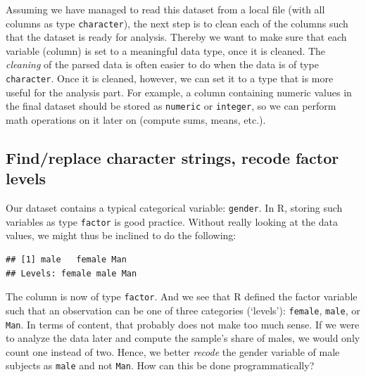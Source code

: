 \documentclass[
  12pt,
]{style/krantz}
\newenvironment{Shaded}{\begin{snugshade}}{\end{snugshade}}
\newcommand{\FunctionTok}[1]{\textcolor[rgb]{0.00,0.00,0.00}{#1}}
\newcommand{\NormalTok}[1]{#1}
\newcommand{\OtherTok}[1]{\textcolor[rgb]{0.56,0.35,0.01}{#1}}
\newcommand{\SpecialCharTok}[1]{\textcolor[rgb]{0.00,0.00,0.00}{#1}}
\begin{document}
Assuming we have managed to read this dataset from a local file (with all columns as type \texttt{character}), the next step is to clean each of the columns such that the dataset is ready for analysis. Thereby we want to make sure that each variable (column) is set to a meaningful data type, once it is cleaned. The \emph{cleaning} of the parsed data is often easier to do when the data is of type \texttt{character}. Once it is cleaned, however, we can set it to a type that is more useful for the analysis part. For example, a column containing numeric values in the final dataset should be stored as \texttt{numeric} or \texttt{integer}, so we can perform math operations on it later on (compute sums, means, etc.).

\hypertarget{findreplace-character-strings-recode-factor-levels}{%
\subsection{Find/replace character strings, recode factor levels}\label{findreplace-character-strings-recode-factor-levels}}

Our dataset contains a typical categorical variable: \texttt{gender}. In R, storing such variables as type \texttt{factor} is good practice. Without really looking at the data values, we might thus be inclined to do the following:

\begin{Shaded}
\end{Shaded}

\begin{verbatim}
## [1] male   female Man   
## Levels: female male Man
\end{verbatim}

The column is now of type \texttt{factor}. And we see that R defined the factor variable such that an observation can be one of three categories (`levels'): \texttt{female}, \texttt{male}, or \texttt{Man}. In terms of content, that probably does not make too much sense. If we were to analyze the data later and compute the sample's share of males, we would only count one instead of two. Hence, we better \emph{recode} the gender variable of male subjects as \texttt{male} and not \texttt{Man}. How can this be done programmatically?
\end{document}
